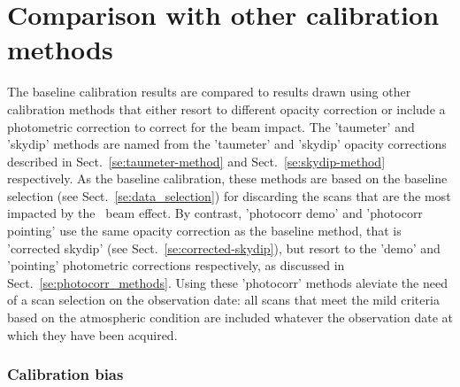 

\section{Comparison with other calibration methods}%
\label{se:photometry_others}

The baseline calibration results are compared to
results drawn using other calibration methods that either resort to different
opacity correction or include a photometric correction to correct for
the beam impact. The 'taumeter' and 'skydip' methods are named from
the 'taumeter' and 'skydip' opacity corrections described in
Sect.~\ref{se:taumeter-method} and Sect.~\ref{se:skydip-method}
respectively. As the baseline calibration, these methods are based on
the baseline selection (see Sect.~\ref{se:data_selection}) for
discarding the scans that are the most impacted by the \afternoon\ beam
effect. By contrast, 'photocorr demo' and 'photocorr pointing' use the
same opacity correction as the baseline method, that is 'corrected
skydip' (see Sect.~\ref{se:corrected-skydip}), but resort to the
'demo' and 'pointing' photometric corrections respectively, as
discussed in Sect.~\ref{se:photocorr_methods}. Using these
'photocorr' methods aleviate the need of a scan selection on the
observation date: all scans that meet the mild criteria based on
the atmospheric condition are included whatever the
observation date at which they have been acquired. 

\subsubsection{Calibration bias}

